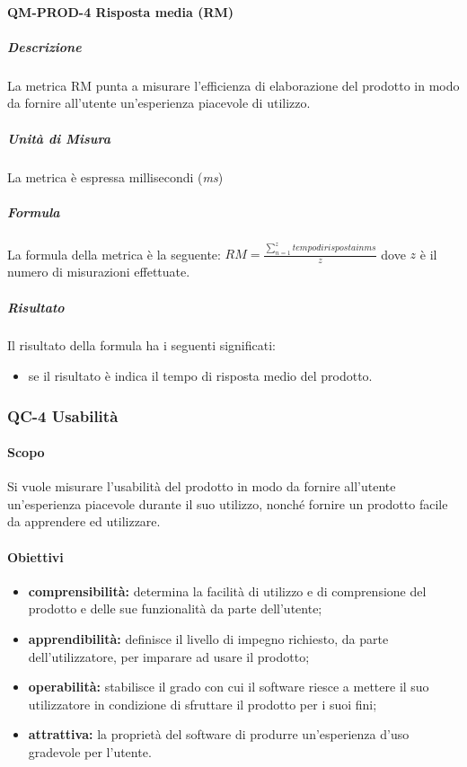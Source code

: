 			\paragraph{QM-PROD-4 Risposta media (RM)}
				\subparagraph{Descrizione}
					La metrica RM punta a misurare l'efficienza di elaborazione del prodotto in modo da fornire all'utente un'esperienza piacevole di utilizzo.
				\subparagraph{Unità di Misura}
					La metrica è espressa millisecondi (\textit{ms})
				\subparagraph{Formula}
					La formula della metrica è la seguente:
					\(
						RM = \frac{\sum_{n=1}^{z} tempo di risposta in ms}{z}
					\)
					dove $z$ è il numero di misurazioni effettuate.
				\subparagraph{Risultato}
					Il risultato della formula ha i seguenti significati:
					\begin{itemize}
						\item se il risultato è indica il tempo di risposta medio del prodotto.
					\end{itemize}

		\subsubsection{QC-4 Usabilità}
			\paragraph{Scopo}
			Si vuole misurare l'usabilità del prodotto in modo da fornire all'utente un'esperienza piacevole durante il suo utilizzo, nonché fornire un prodotto facile da apprendere ed utilizzare.
			\paragraph{Obiettivi}
				\begin{itemize}
					\item \textbf{comprensibilità:} determina la facilità di utilizzo e di comprensione del prodotto e delle sue funzionalità da parte dell'utente;
					\item \textbf{apprendibilità:} definisce il livello di impegno richiesto, da parte dell'utilizzatore, per imparare ad usare il prodotto;
					\item \textbf{operabilità:} stabilisce il grado con cui il software riesce a mettere il suo utilizzatore in condizione di sfruttare il prodotto per i suoi fini;
					\item \textbf{attrattiva:} la proprietà del software di produrre un'esperienza d'uso gradevole per l'utente.
				\end{itemize}
